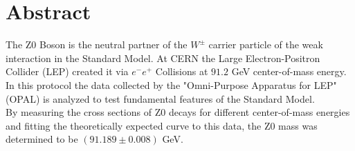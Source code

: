 \section*{Abstract}
	The Z0 Boson is the neutral partner of the $W^{\pm}$ carrier particle of the weak interaction in the Standard Model. At CERN the Large Electron-Positron Collider (LEP) created it via $e^{-}e^{+}$ Collisions at $91.2$ GeV center-of-mass energy. In this protocol the data collected by the "Omni-Purpose Apparatus for LEP" (OPAL) is analyzed to test fundamental features of the Standard Model.\\
	By measuring the cross sections of Z0 decays for different center-of-mass energies and fitting the theoretically expected curve to this data, the Z0 mass was determined to be $(91.189\pm0.008)$ GeV.